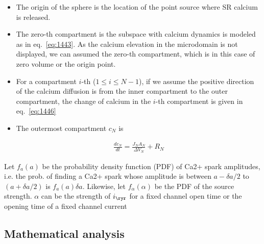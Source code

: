 \begin{itemize}
\item The origin of the sphere is the location of the point source
  where SR calcium is released. 

\item The zero-th compartment is the subspace with calcium dynamics is
  modeled as in eq.~\eqref{eq:1443}. As the calcium elevation in the
  microdomain is not displayed, we can assumed the zero-th
  compartment, which is in this case of zero volume or the origin
  point.
  

\item For a compartment $i$-th ($1\le i \le N-1$), if we assume the
  positive direction of the calcium diffusion is from the inner
  compartment to the outer compartment, the change of calcium in the
  $i$-th compartment is given in eq.~\eqref{eq:1446}


\item The outermost compartment $c_N$ is

  \begin{equation}
    \label{eq:1448}
    \begin{split}
      \frac{dc_N}{dt} = \frac{J_N A_N}{\Delta V_N} + R_N
    \end{split}
  \end{equation}

\end{itemize}




Let $f_a(a)$ be the probability density function (PDF) of Ca2+ spark
amplitudes, i.e. the prob. of finding a Ca2+ spark whose amplitude is
between $a-\delta a/2$ to $(a+\delta a/2)$ is $f_a(a)\delta
a$. Likewise, let $f_\alpha(\alpha)$ be the PDF of the source
strength. $\alpha$ can be the strength of $i_\ryr$ for a fixed channel
open time or the opening time of a fixed channel current




\subsection{Mathematical analysis}
\label{sec:math-analys-5}

